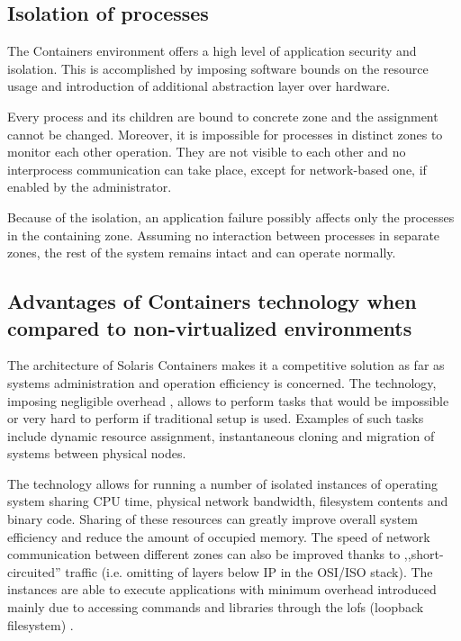 \documentclass[11pt]{book}
\begin{document}
      \subsection{Isolation of processes}
      \label{sub:}

        The Containers environment offers a high level of application security and isolation. This is accomplished by
        imposing software bounds on the resource usage and introduction of additional abstraction layer over hardware.

        Every process and its children are bound to concrete zone and the assignment cannot be changed. Moreover, it is
        impossible for processes in distinct zones to monitor each other operation. They are not visible to each other
        and no interprocess communication can take place, except for network-based one, if enabled by the administrator.

        Because of the isolation, an application failure possibly affects only the processes in the containing zone.
        Assuming no interaction between processes in separate zones, the rest of the system remains intact and can
        operate normally.
        
      

      \subsection{Advantages of Containers technology when compared to non-virtualized environments}
      \label{sub:}

        The architecture of Solaris Containers makes it a competitive solution as far as systems administration and
        operation efficiency is concerned. The technology, imposing negligible overhead \cite{price}, allows to perform
        tasks that would be impossible or very hard to perform if traditional setup is used. Examples of such tasks
        include dynamic resource assignment, instantaneous cloning and migration of systems between physical nodes.

        The technology allows for running a number of isolated instances of operating system sharing CPU time,
        physical network bandwidth, filesystem contents and binary code. Sharing of these resources can greatly improve
        overall system efficiency and reduce the amount of occupied memory. The speed of network communication between
        different zones can also be improved thanks to ,,short-circuited'' traffic (i.e. omitting of layers below IP in
        the OSI/ISO stack). The instances are able to execute applications with minimum overhead introduced mainly due
        to accessing commands and libraries through the lofs (loopback filesystem) \cite{price,fsag}.
\end{document}
